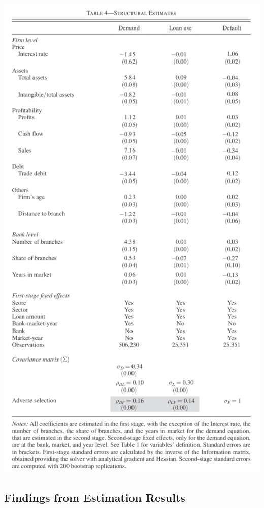 \documentclass[
]{book}
\begin{document}
\includegraphics{figuretable/Crawford_2018_Table4.png}

\hypertarget{findings-from-estimation-results}{%
\subsection{Findings from Estimation Results}\label{findings-from-estimation-results}}
\end{document}
